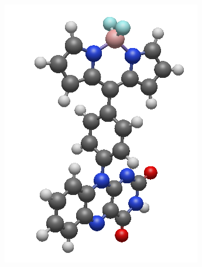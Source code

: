\begin{figure}
\begin{minipage}{0.4\textwidth}
\centering
\includegraphics[width=\textwidth]{Pics/FLVA.png}
\end{minipage}
\begin{minipage}{0.4\textwidth}
\centering

\end{minipage}
\end{figure}
